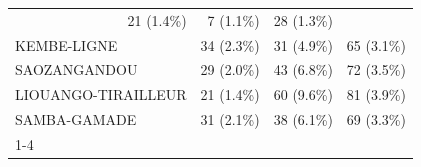 \begin{table}[!h]
\begin{tabular}{llll}
  \multicolumn{1}{r}{21 (1.4\%)} &
  \multicolumn{1}{r}{7 (1.1\%)} &
  \multicolumn{1}{r}{28 (1.3\%)} \\
\multicolumn{1}{l}{\hspace{1em}KEMBE-LIGNE} &
  \multicolumn{1}{r}{34 (2.3\%)} &
  \multicolumn{1}{r}{31 (4.9\%)} &
  \multicolumn{1}{r}{65 (3.1\%)} \\
\multicolumn{1}{l}{\hspace{1em}SAOZANGANDOU} &
  \multicolumn{1}{r}{29 (2.0\%)} &
  \multicolumn{1}{r}{43 (6.8\%)} &
  \multicolumn{1}{r}{72 (3.5\%)} \\
\multicolumn{1}{l}{\hspace{1em}LIOUANGO-TIRAILLEUR} &
  \multicolumn{1}{r}{21 (1.4\%)} &
  \multicolumn{1}{r}{60 (9.6\%)} &
  \multicolumn{1}{r}{81 (3.9\%)} \\
\multicolumn{1}{l}{\hspace{1em}SAMBA-GAMADE} &
  \multicolumn{1}{r}{31 (2.1\%)} &
  \multicolumn{1}{r}{38 (6.1\%)} &
  \multicolumn{1}{r}{69 (3.3\%)} \\
\cline{1-4}
\end{tabular}
\end{table}
